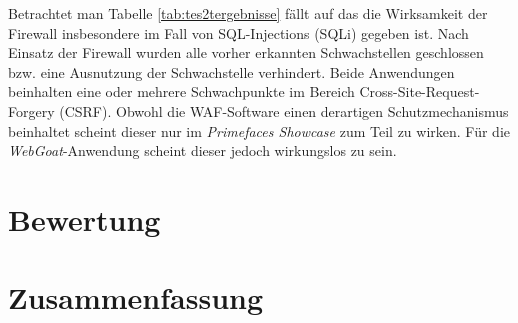 Betrachtet man Tabelle \ref{tab:tes2tergebnisse} fällt auf das die Wirksamkeit der Firewall insbesondere im Fall von SQL-Injections (SQLi) gegeben ist. Nach Einsatz der Firewall wurden alle vorher erkannten Schwachstellen geschlossen bzw. eine Ausnutzung der Schwachstelle verhindert. Beide Anwendungen beinhalten eine oder mehrere Schwachpunkte im Bereich Cross-Site-Request-Forgery (CSRF). Obwohl die WAF-Software einen derartigen Schutzmechanismus beinhaltet scheint dieser nur im \emph{Primefaces Showcase} zum Teil zu wirken. Für die \emph{WebGoat}-Anwendung scheint dieser jedoch wirkungslos zu sein.


\section{Bewertung}





\section{Zusammenfassung}


